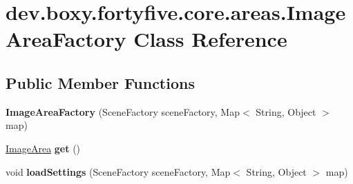 \hypertarget{classdev_1_1boxy_1_1fortyfive_1_1core_1_1areas_1_1_image_area_factory}{
\section{dev.boxy.fortyfive.core.areas.ImageAreaFactory Class Reference}
\label{d0/dc6/classdev_1_1boxy_1_1fortyfive_1_1core_1_1areas_1_1_image_area_factory}
}
\subsection*{Public Member Functions}
\begin{DoxyCompactItemize}
\item 
\hypertarget{classdev_1_1boxy_1_1fortyfive_1_1core_1_1areas_1_1_image_area_factory_a09d450af22499c8edaee7a12557829c9}{
{\bfseries ImageAreaFactory} (SceneFactory sceneFactory, Map$<$ String, Object $>$ map)}
\label{d0/dc6/classdev_1_1boxy_1_1fortyfive_1_1core_1_1areas_1_1_image_area_factory_a09d450af22499c8edaee7a12557829c9}

\item 
\hypertarget{classdev_1_1boxy_1_1fortyfive_1_1core_1_1areas_1_1_image_area_factory_af5dbd5189473fd76b02df9861029e0c0}{
\hyperlink{classdev_1_1boxy_1_1fortyfive_1_1core_1_1areas_1_1_image_area}{ImageArea} {\bfseries get} ()}
\label{d0/dc6/classdev_1_1boxy_1_1fortyfive_1_1core_1_1areas_1_1_image_area_factory_af5dbd5189473fd76b02df9861029e0c0}

\item 
\hypertarget{classdev_1_1boxy_1_1fortyfive_1_1core_1_1areas_1_1_image_area_factory_a9a340f94422fb9a77a9b8e7dc5a21891}{
void {\bfseries loadSettings} (SceneFactory sceneFactory, Map$<$ String, Object $>$ map)}
\label{d0/dc6/classdev_1_1boxy_1_1fortyfive_1_1core_1_1areas_1_1_image_area_factory_a9a340f94422fb9a77a9b8e7dc5a21891}

\end{DoxyCompactItemize}
